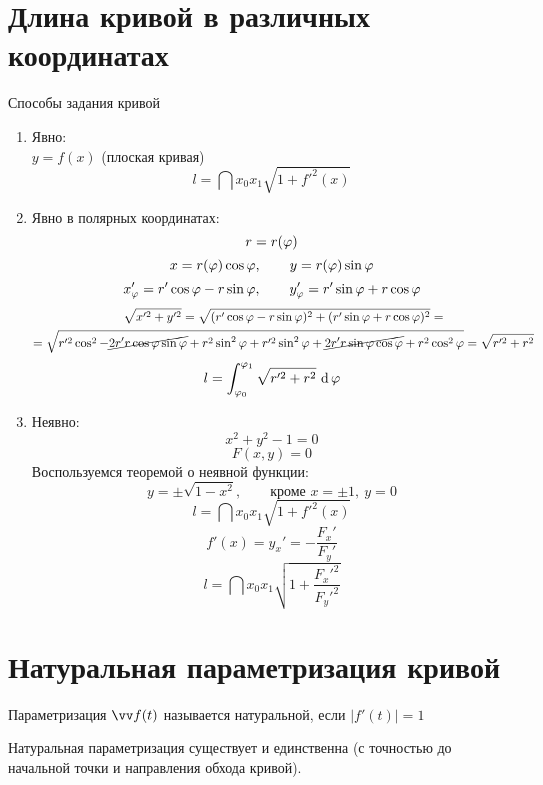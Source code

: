 \section{Длина кривой в различных координатах}

\begin{undefthm}{Способы задания кривой}
	\begin{enumerate}
		\item Явно: \\
		$ y = f(x) $ (плоская кривая)
		$$ l = \dint{x_0}{x_1}{\sqrt{1 + f'^2(x)}} $$
		\item Явно в полярных координатах:
		$$ r = r(\vphi) $$
		$$ x = r(\vphi)\cos \vphi, \qquad y = r(\vphi)\sin \vphi $$
		$$ x_\vphi' = r'\cos \vphi - r\sin \vphi, \qquad y_\vphi' = r'\sin \vphi + r\cos\vphi $$
		\begin{multline*}
			\sqrt{x'^2 + y'^2} = \sqrt{(r'\cos\vphi - r\sin\vphi)^2 + (r'\sin\vphi + r\cos\vphi)^2} = \\
			= \sqrt{r'^2\cos^2 - \cancel{2r'r\cos\vphi\sin\vphi} + r^2\sin^2\vphi + r'^2\sin^2\vphi + \cancel{2r'r\sin\vphi\cos\vphi} + r^2\cos^2\vphi} = \sqrt{r'^2 + r^2}
		\end{multline*}
		$$ l = \dint[\vphi]{\vphi_0}{\vphi_1}{\sqrt{r'^2 + r^2}} $$
		\item Неявно:
		$$ x^2 + y^2 - 1 = 0 $$
		$$ F(x, y) = 0 $$
		Воспользуемся теоремой о неявной функции:
		$$ y = \pm \sqrt{1 - x^2}, \qquad \text{кроме } x = \pm 1, ~ y = 0 $$
		$$ l = \dint{x_0}{x_1}{\sqrt{1 + f'^2(x)}} $$
		$$ f'(x) = y_x' = -\frac{F_x'}{F_y'} $$
		$$ l = \dint{x_0}{x_1}{\sqrt{1 + \frac{F_x'^2}{F_y'^2}}} $$
	\end{enumerate}
\end{undefthm}

\section{Натуральная параметризация кривой}

\begin{definition}
	Параметризация $ \vv f(t) $ называется натуральной, если $ |f'(t)| = 1 $
\end{definition}

\begin{theorem}\label{th:natural_par}
	Натуральная параметризация существует и единственна (с точностью до начальной точки и направления обхода кривой).
\end{theorem}

